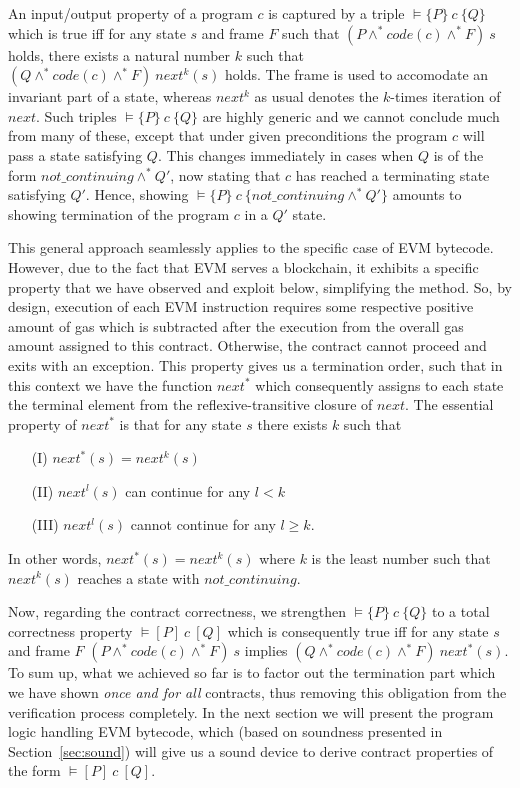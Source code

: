 \documentclass[sigplan,10pt,review]{acmart}\settopmatter{printfolios=true,printccs=false,printacmref=false}
\newcommand{\sconj}{\wedge^*}
\newcommand{\pvalid}[3]{\models\{#1\}\:#2\:\{#3\}}
\newcommand{\tvalid}[3]{\models [#1]\:#2\:[#3]}
\newcommand{\xnext}{\mathit{next}}
\newcommand{\code}[1]{\mathit{code}(#1)}
\newcommand{\ncont}{\mathit{not\_continuing}}
\begin{document}
An input/output property of a program $c$ is captured by a triple
$\pvalid{P}{c}{Q}$ which is true iff for any state $s$ and frame $F$ such that
$(P \sconj \code{c} \sconj F)\: s$ holds, there exists a natural number $k$ such that 
$(Q \sconj \code{c} \sconj F)\: \xnext^k(s)$ holds. The frame is used to accomodate
an invariant part of a state, whereas $\xnext^k$ as usual denotes the $k$-times iteration of $\xnext$.
Such triples $\pvalid{P}{c}{Q}$ are highly generic and we cannot conclude much from many of these, except that
under given preconditions the program $c$ will pass a state satisfying $Q$. This changes immediately in cases when $Q$ is of
the form $\ncont \sconj Q'$, now stating that $c$ has reached a terminating state satisfying $Q'$.
Hence, showing $\pvalid{P}{c}{\ncont \sconj Q'}$ amounts to showing termination of the program $c$ in
a $Q'$ state.

This general approach seamlessly applies to the specific case of EVM bytecode. However,
due to the fact that EVM serves a blockchain, it exhibits a specific property that we have observed and exploit below, 
simplifying the method. 
So, by design, execution of each EVM instruction requires some respective positive amount of gas which
is subtracted after the execution from the overall gas amount assigned to this contract. 
Otherwise, the contract cannot proceed and exits with an exception.  
This property gives us a termination order, such that in this context we have the function $\xnext^*$ which 
consequently assigns to each state the terminal element from the reflexive-transitive closure of $\xnext$. 
The essential property of $\xnext^*$ is that for any state $s$ there exists $k$ such that
\begin{itemize}
\item[(I)] $\xnext^*(s) = \xnext^k(s)$
\item[(II)] $\xnext^l(s)$ can continue for any $l < k$
\item[(III)] $\xnext^l(s)$ cannot continue for any $l \ge k$.
\end{itemize}
In other words, $\xnext^*(s) = \xnext^k(s)$ where $k$ is the least number such that
$\xnext^k(s)$ reaches a state with $\ncont$. 

Now, regarding the contract correctness, we strengthen $\pvalid{P}{c}{Q}$ to 
a total correctness property $\tvalid{P}{c}{Q}$ which is consequently true iff
for any state $s$ and frame $F$ 
$(P \sconj \code{c} \sconj F)\: s$ implies $(Q \sconj \code{c} \sconj F)\: \xnext^*(s)$. 
To sum up, what we achieved so far is to factor out the termination part which we have 
shown \emph{once and for all} contracts, thus removing this obligation from the verification
process completely. In the next section we will present the program logic handling EVM bytecode, 
which (based on soundness presented in Section~\ref{sec:sound}) will give us 
a sound device to derive contract properties of the form $\tvalid{P}{c}{Q}$.   
%       
\end{document}
